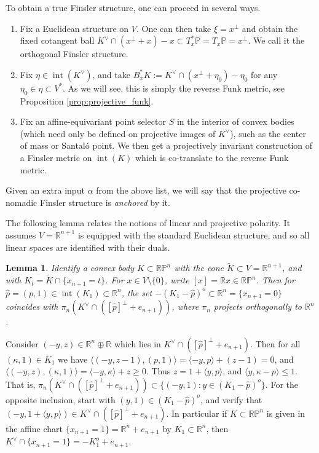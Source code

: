 \documentclass[reqno,10pt]{amsart}
\newcounter{mp}
\newtheorem{Lemma}[Proposition]{Lemma}
\DeclareMathOperator{\inter}{int}
\newcommand{\R}{\mathbb{R}}
\newcommand{\PP}{\mathbb{P}}
\begin{document}
To obtain a true Finsler structure, one can proceed in several ways.
\begin{enumerate}
	\item Fix a Euclidean structure on $V$. One can then take $\xi=x^\perp$ and obtain the fixed cotangent ball $K^\vee\cap (x^\perp + x)-x\subset T^*_x\PP=T_x\PP=x^\perp$. We call it the orthogonal Finsler structure.
	\item Fix $\eta\in \inter(K^\vee)$, and take $B_x^*K:=K^\vee\cap (x^\perp +\eta_0)-\eta_0$ for any $\eta_0\in\eta\subset V^*$. As we will see, this is simply the reverse Funk metric, see Proposition \ref{prop:projective_funk}.
	\item Fix an affine-equivariant point selector $S$ in the interior of convex bodies (which need only be defined on projective images of $K^\vee$), such as the center of mass or Santal\'o point. We then get a projectively invariant construction of a Finsler metric on $\inter(K)$ which is co-translate to the reverse Funk metric.
\end{enumerate}
Given an extra input $\alpha$ from the above list, we will say that the projective co-nomadic Finsler structure is \emph{anchored} by it.

The following lemma relates the notions of linear and projective polarity. It assumes $V=\R^{n+1}$ is equipped with the standard Euclidean structure, and so all linear spaces are identified with their duals.
\begin{Lemma}\label{lem:two_dualities}
	Identify a convex body $K\subset \R\PP^n$ with the cone $\tilde K\subset V=\R^{n+1}$, and with $K_t=\tilde K\cap \{x_{n+1}=t\}$. For $x\in V\setminus \{0\}$, write $[x]=\R x\in \R\PP^n$.
	Then for $\hat p=(p,1)\in \inter(K_1)\subset\R^n$, the set $-(K_1-\hat p)^o\subset \R^n=\{x_{n+1}=0\}$ coincides with $\pi_n(K^\vee\cap ([\hat p]^\perp+e_{n+1}))$, where $\pi_n$ projects orthogonally to $\R^n$.
	\end{Lemma}
\proof
Consider $(-y,z)\in \R^n\oplus \R$ which lies in $K^\vee\cap ([\hat p]^\perp+e_{n+1})$. Then for all $(\kappa,1)\in K_1$ we have $\langle (-y, z-1), (p,1)\rangle=\langle -y,p\rangle +(z-1)=0$, and $\langle (-y,z),(\kappa,1)\rangle =\langle -y,\kappa\rangle +z\geq 0$. Thus $z=1+\langle y,p\rangle$, and $\langle y,\kappa-p\rangle \leq 1$. That is, $\pi_n(K^\vee\cap ([\hat p]^\perp+e_{n+1}))\subset \{(-y,1): y\in (K_1-\hat p)^o\}$. For the opposite inclusion, start with $(y,1)\in (K_1-\hat p)^o$, and verify that $(-y,1+\langle y, p\rangle )\in K^\vee\cap ([\hat p]^\perp+e_{n+1})$.
\endproof
In particular if $K\subset \R\PP^n$ is given in the affine chart $\{x_{n+1}=1\}=\R^n+e_{n+1}$ by $K_1\subset \R^n$, then $K^\vee\cap \{x_{n+1}=1\}=-K_1^o+e_{n+1}$.
\end{document}
